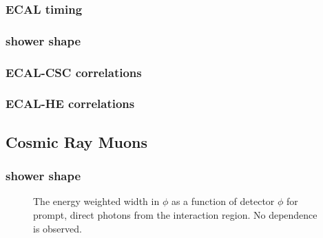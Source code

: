 \documentclass{cmspaper}
\begin{document}
\subsubsection{ECAL timing}

\subsubsection{shower shape}

\subsubsection{ECAL-CSC correlations}

\subsubsection{ECAL-HE correlations}


\subsection{Cosmic Ray Muons}

\subsubsection{shower shape}

\begin{figure}[hbtp]
  \begin{center}
    \caption{The energy weighted width in $\phi$ as a function of detector $\phi$ for prompt, direct photons from the interaction region.  No dependence is observed.}
    \label{fig:PromptPhiWidPhi}
  \end{center}
\end{figure}
\end{document}
